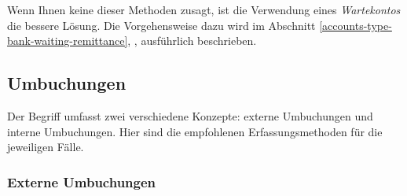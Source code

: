 Wenn Ihnen keine dieser Methoden zusagt, ist die Verwendung eines \emph{Wartekontos} die bessere Lösung. Die Vorgehensweise dazu wird im Abschnitt \vref{accounts-type-bank-waiting-remittance}, , ausführlich beschrieben.


\subsection{Umbuchungen\label{transactions-new-transfer}}

Der Begriff  umfasst zwei verschiedene Konzepte: externe Umbuchungen und interne Umbuchungen. Hier sind die empfohlenen Erfassungsmethoden für die jeweiligen Fälle.


\subsubsection{Externe Umbuchungen\label{transactions-new-transfer-external}}

